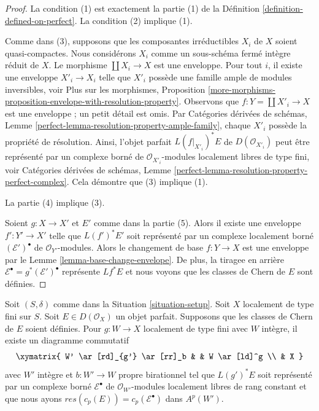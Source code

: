 \begin{proof}
La condition (1) est exactement la partie (1) de la Définition \ref{definition-defined-on-perfect}.
La condition (2) implique (1).

\medskip\noindent
Comme dans (3), supposons que les composantes irréductibles $X_i$ de $X$ soient quasi-compactes.
Nous considérons $X_i$ comme un sous-schéma fermé intègre réduit de $X$.
Le morphisme $\coprod X_i \to X$ est une enveloppe. Pour tout $i$, il
existe une enveloppe $X'_i \to X_i$ telle que $X'_i$ possède une famille ample
de modules inversibles, voir Plus sur les morphismes, Proposition
\ref{more-morphisms-proposition-envelope-with-resolution-property}.
Observons que $f : Y = \coprod X'_i \to X$ est une enveloppe ; un petit détail est omis.
Par Catégories dérivées de schémas, Lemme
\ref{perfect-lemma-resolution-property-ample-family},
chaque $X'_i$ possède la propriété de résolution.
Ainsi, l'objet parfait $L(f|_{X'_i})^*E$ de $D(\mathcal{O}_{X'_i})$
peut être représenté par un complexe borné
de $\mathcal{O}_{X'_i}$-modules localement libres de type fini, voir
Catégories dérivées de schémas, Lemme
\ref{perfect-lemma-resolution-property-perfect-complex}.
Cela démontre que (3) implique (1).

\medskip\noindent
La partie (4) implique (3).

\medskip\noindent
Soient $g : X \to X'$ et $E'$ comme dans la partie (5). Alors il existe une
enveloppe $f' : Y' \to X'$ telle que $L(f')^*E'$ soit représenté par un
complexe localement borné $(\mathcal{E}')^\bullet$ de $\mathcal{O}_{Y'}$-modules.
Alors le changement de base $f : Y \to X$ est une enveloppe par le
Lemme \ref{lemma-base-change-envelope}. De plus, la tiragee en arrière
$\mathcal{E}^\bullet = g^*(\mathcal{E}')^\bullet$ représente $Lf^*E$
et nous voyons que les classes de Chern de $E$ sont définies.
\end{proof}

\begin{lemma}
\label{lemma-chern-classes-computed}
Soit $(S, \delta)$ comme dans la Situation \ref{situation-setup}.
Soit $X$ localement de type fini sur $S$. Soit $E \in D(\mathcal{O}_X)$
un objet parfait. Supposons que les classes de Chern de $E$ soient définies.
Pour $g : W \to X$ localement de type fini avec $W$ intègre, il existe
un diagramme commutatif
$$
\xymatrix{
W' \ar[rd]_{g'} \ar[rr]_b & & W \ar[ld]^g \\
& X
}
$$
avec $W'$ intègre et $b : W' \to W$ propre birationnel tel que $L(g')^*E$
soit représenté par un complexe borné $\mathcal{E}^\bullet$ de
$\mathcal{O}_{W'}$-modules localement libres de rang constant et que nous ayons
$res(c_p(E)) = c_p(\mathcal{E}^\bullet)$ dans $A^p(W')$.
\end{lemma}


